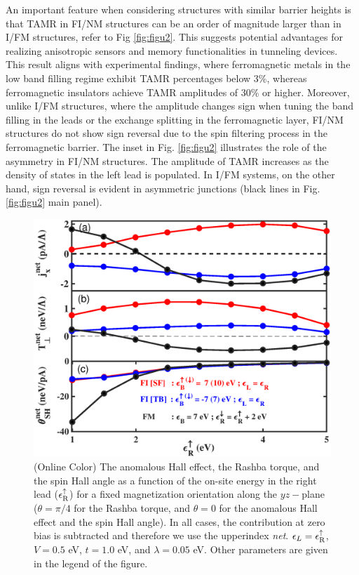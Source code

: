 \documentclass[10pt,pr,twocolumn,showpacs,amssymb,floatfix,superscriptaddress]{revtex4-1}
\newcommand{\upa}{\uparrow}
\newcommand{\eps}{\epsilon}
\begin{document}
An important feature when considering structures with similar barrier heights is that TAMR in FI/NM structures can be an order of magnitude larger than in I/FM structures, refer to Fig \ref{fig:figu2}. This suggests potential advantages for realizing anisotropic sensors and memory functionalities in tunneling devices. This result aligns with experimental findings, where ferromagnetic metals in the low band filling regime exhibit TAMR percentages below 3\%, whereas ferromagnetic insulators achieve TAMR amplitudes of 30\% or higher. Moreover, unlike I/FM structures, where the amplitude changes sign when tuning the band filling in the leads or the exchange splitting in the ferromagnetic layer, FI/NM structures do not show sign reversal due to the spin filtering process in the ferromagnetic barrier. The inset in Fig. \ref{fig:figu2} illustrates the role of the asymmetry in FI/NM structures. The amplitude of TAMR increases as the density of states in the left lead is populated. In I/FM systems, on the other hand, sign reversal is evident in asymmetric junctions (black lines in Fig. \ref{fig:figu2} main panel).
\begin{figure}
\centering
\includegraphics[width=0.8\columnwidth,clip=false]{fig3.eps}
\caption{(Online Color) The anomalous Hall effect, the Rashba torque, and the spin Hall angle as a function of the on-site energy in the right lead ($\eps^\upa_{\rm R}$) for a fixed magnetization orientation along the $yz-$plane ($\theta = \pi/4$ for the Rashba torque, and $\theta = 0$ for the anomalous Hall effect and the spin Hall angle). In all cases, the contribution at zero bias is subtracted and therefore we use the upperindex \textit{net}. $\eps_L = \eps_{\rm R}^\upa$, $V = 0.5$ eV, $t = 1.0$ eV, and $\lambda = 0.05$ eV. Other parameters are given in the legend of the figure.}
\label{fig:figu3}
\end{figure}
\end{document}
